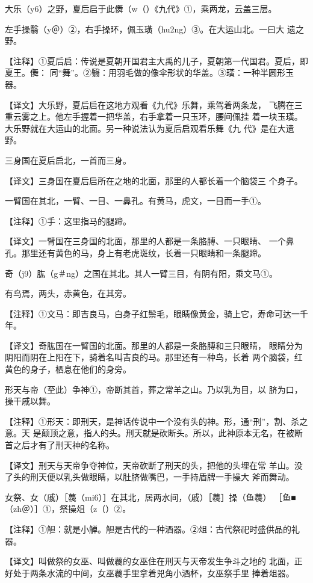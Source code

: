 \documentclass[a4paper,12pt,UTF8,twoside]{ctexbook}
\begin{document}
大乐（y6）之野，夏后启于此儛（w（）《九代》①，乘两龙，云盖三层。

左手操翳（y＠）②，右手操环，佩玉璜（hu2ng）③。在大运山北。一曰大 遗之野。

【注释】①夏后启：传说是夏朝开国君主大禹的儿子，夏朝第一代国君。夏后，即夏王。儛： 同“舞”。②翳：用羽毛做的像伞形状的华盖。③璜：一种半圆形玉器。

【译文】大乐野，夏后启在这地方观看《九代》乐舞，乘驾着两条龙， 飞腾在三重云雾之上。他左手握着一把华盖，右手拿着一只玉环，腰间佩挂 着一块玉璜。大乐野就在大运山的北面。另一种说法认为夏后启观看乐舞《九 代》是在大遗野。

三身国在夏后启北，一首而三身。

【译文】三身国在夏后启所在之地的北面，那里的人都长着一个脑袋三 个身子。

一臂国在其北，一臂、一目、一鼻孔。有黄马，虎文，一目而一手①。

【注释】①手：这里指马的腿蹄。

【译文】一臂国在三身国的北面，那里的人都是一条胳膊、一只眼睛、 一个鼻孔。那里还有黄色的马，身上有老虎斑纹，长着一只眼睛和一条腿蹄。

奇（j9）肱（g＃ng）之国在其北。其人一臂三目，有阴有阳，乘文马①。

有鸟焉，两头，赤黄色，在其旁。

【注释】①文马：即吉良马，白身子红鬃毛，眼睛像黄金，骑上它，寿命可达一千年。

【译文】奇肱国在一臂国的北面。那里的人都是一条胳膊和三只眼睛， 眼睛分为阴阳而阴在上阳在下，骑着名叫吉良的马。那里还有一种鸟，长着 两个脑袋，红黄色的身子，栖息在他们的身旁。

形天与帝（至此）争神①，帝断其首，葬之常羊之山。乃以乳为目，以 脐为口，操干戚以舞。

【注释】①形天：即刑天，是神话传说中一个没有头的神。形，通“刑”，割、杀之意。天 是颠顶之意，指人的头。刑天就是砍断头。所以，此神原本无名，在被断首之后才有了刑天神的名称。

【译文】刑天与天帝争夺神位，天帝砍断了刑天的头，把他的头埋在常 羊山。没了头的刑天便以乳头做眼睛，以肚脐做嘴巴，一手持盾牌一手操大 斧而舞动。

女祭、女（戚）［薎（mi6）］在其北，居两水间，（戚）［薎］操（鱼薎） ［鱼■（zh＠）］①，祭操俎（z（）②。

【注释】①觛：就是小觯。觛是古代的一种酒器。②俎：古代祭祀时盛供品的礼器。

【译文】叫做祭的女巫、叫做薎的女巫住在刑天与天帝发生争斗之地的 北面，正好处于两条水流的中间，女巫薎手里拿着兕角小酒杯，女巫祭手里 捧着俎器。
\end{document}

